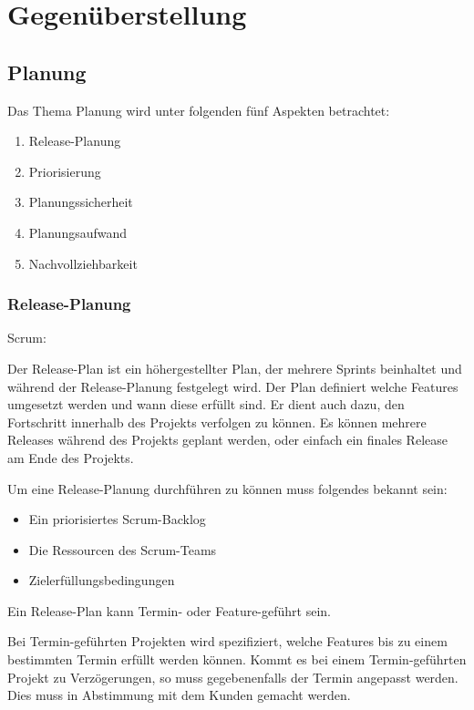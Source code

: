 \chapter{Gegenüberstellung}
\thispagestyle{fancy}
\section{Planung}

Das Thema Planung wird unter folgenden fünf Aspekten betrachtet:
\begin{enumerate}
\item Release-Planung
\item Priorisierung
\item Planungssicherheit
\item Planungsaufwand
\item Nachvollziehbarkeit
\end{enumerate}

\subsection{Release-Planung}

{\Large Scrum:} \cite{planningReleaseScrum} \medskip

Der Release-Plan ist ein höhergestellter Plan, der mehrere Sprints beinhaltet und während der Release-Planung festgelegt wird. Der Plan definiert welche Features umgesetzt werden und wann diese erfüllt sind. Er dient auch dazu, den Fortschritt innerhalb des Projekts verfolgen zu können. Es können mehrere Releases während des Projekts geplant werden, oder einfach ein finales Release am Ende des Projekts. \medskip

Um eine Release-Planung durchführen zu können muss folgendes bekannt sein:
\begin{itemize}
\item Ein priorisiertes Scrum-Backlog
\item Die Ressourcen des Scrum-Teams
\item Zielerfüllungsbedingungen
\end{itemize}
Ein Release-Plan kann Termin- oder Feature-geführt sein.\smallskip

Bei Termin-geführten Projekten wird spezifiziert, welche Features bis zu einem bestimmten Termin erfüllt werden können.\smallskip
Kommt es bei einem Termin-geführten Projekt zu Verzögerungen, so muss gegebenenfalls der Termin angepasst werden. Dies muss in Abstimmung mit dem Kunden gemacht werden.

